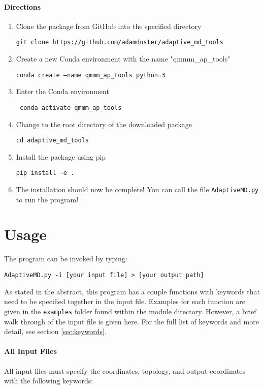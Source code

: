 \documentclass{article}
\begin{document}
\paragraph{Directions}
\begin{enumerate}
\item Clone the package from GitHub into the specified directory

\texttt{git clone \url{https://github.com/adamduster/adaptive_md_tools}}

\item Create a new Conda environment with the name "qmmm\_ap\_tools"

\texttt{conda create --name qmmm\_ap\_tools python=3}

\item Enter the Conda environment

\texttt{ conda activate qmmm\_ap\_tools }

\item Change to the root directory of the downloaded package

\texttt{cd adaptive\_md\_tools}

\item Install the package using pip

\texttt{pip install -e .}

\item The installation should now be complete!
You can call the file \texttt{AdaptiveMD.py} to run the program!
\end{enumerate}

\section{Usage}
The program can be invoked by typing:

\texttt{AdaptiveMD.py -i [your input file] > [your output path]}

As stated in the abstract, this program has a couple functions with keywords that need to be specified together in the input file.
Examples for each function are given in the \texttt{examples} folder found within the module directory.
However, a brief walk through of the input file is given here.
For the full list of keywords and more detail, see section \ref{sec:keywords}.

\paragraph{All Input Files}
All input files must specify the coordinates, topology, and output coordinates with the following keywords:
\end{document}
